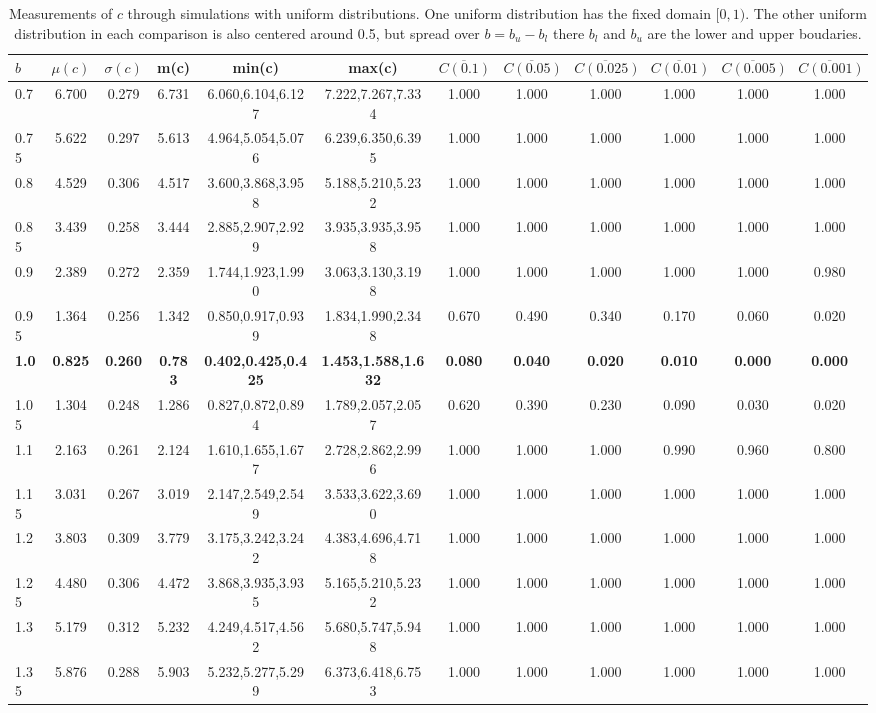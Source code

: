 \begin{table*}[h!]
\begin{center}
\begin{tabular}{| l | c | c | c | c | c | c | c | c | c | c | c |}\hline
$b$ & $\mu(c)$ & $\sigma(c)$ & m(c) & min(c) & max(c) & $\overline{C(0.1)}$ & $\overline{C(0.05)}$ & $\overline{C(0.025)}$ & $\overline{C(0.01)}$ & $\overline{C(0.005)}$ & $\overline{C(0.001)}$ \\\hline\hline
0.7 & 6.700 & 0.279 & 6.731 & 6.060,6.104,6.127 & 7.222,7.267,7.334  & 1.000  & 1.000  & 1.000  & 1.000  & 1.000  & 1.000 \\\hline
0.75 & 5.622 & 0.297 & 5.613 & 4.964,5.054,5.076 & 6.239,6.350,6.395  & 1.000  & 1.000  & 1.000  & 1.000  & 1.000  & 1.000 \\\hline
0.8 & 4.529 & 0.306 & 4.517 & 3.600,3.868,3.958 & 5.188,5.210,5.232  & 1.000  & 1.000  & 1.000  & 1.000  & 1.000  & 1.000 \\\hline
0.85 & 3.439 & 0.258 & 3.444 & 2.885,2.907,2.929 & 3.935,3.935,3.958  & 1.000  & 1.000  & 1.000  & 1.000  & 1.000  & 1.000 \\\hline
0.9 & 2.389 & 0.272 & 2.359 & 1.744,1.923,1.990 & 3.063,3.130,3.198  & 1.000  & 1.000  & 1.000  & 1.000  & 1.000  & 0.980 \\\hline
0.95 & 1.364 & 0.256 & 1.342 & 0.850,0.917,0.939 & 1.834,1.990,2.348  & 0.670  & 0.490  & 0.340  & 0.170  & 0.060  & 0.020 \\\hline
{\bf 1.0} & {\bf 0.825} & {\bf 0.260} & {\bf 0.783} & {\bf 0.402,0.425,0.425} & {\bf 1.453,1.588,1.632} & {\bf 0.080} & {\bf 0.040} & {\bf 0.020} & {\bf 0.010} & {\bf 0.000} & {\bf 0.000} \\\hline
1.05 & 1.304 & 0.248 & 1.286 & 0.827,0.872,0.894 & 1.789,2.057,2.057  & 0.620  & 0.390  & 0.230  & 0.090  & 0.030  & 0.020 \\\hline
1.1 & 2.163 & 0.261 & 2.124 & 1.610,1.655,1.677 & 2.728,2.862,2.996  & 1.000  & 1.000  & 1.000  & 0.990  & 0.960  & 0.800 \\\hline
1.15 & 3.031 & 0.267 & 3.019 & 2.147,2.549,2.549 & 3.533,3.622,3.690  & 1.000  & 1.000  & 1.000  & 1.000  & 1.000  & 1.000 \\\hline
1.2 & 3.803 & 0.309 & 3.779 & 3.175,3.242,3.242 & 4.383,4.696,4.718  & 1.000  & 1.000  & 1.000  & 1.000  & 1.000  & 1.000 \\\hline
1.25 & 4.480 & 0.306 & 4.472 & 3.868,3.935,3.935 & 5.165,5.210,5.232  & 1.000  & 1.000  & 1.000  & 1.000  & 1.000  & 1.000 \\\hline
1.3 & 5.179 & 0.312 & 5.232 & 4.249,4.517,4.562 & 5.680,5.747,5.948  & 1.000  & 1.000  & 1.000  & 1.000  & 1.000  & 1.000 \\\hline
1.35 & 5.876 & 0.288 & 5.903 & 5.232,5.277,5.299 & 6.373,6.418,6.753  & 1.000  & 1.000  & 1.000  & 1.000  & 1.000  & 1.000 \\\hline
\end{tabular}
\caption{Measurements of $c$ through simulations
with uniform distributions.
One uniform distribution has the fixed domain $[0,1)$.
The other uniform distribution in each comparison
is also centered around 0.5,
but spread over $b=b_u-b_l$ there $b_l$ and $b_u$ are the lower and upper boudaries.}
\end{center}
\end{table*}